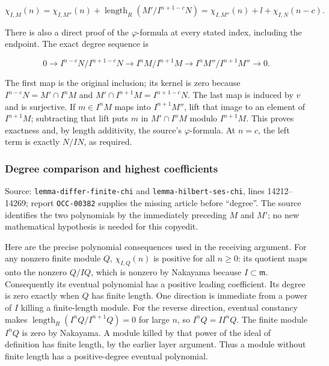 \[
\chi_{I,M}(n)=\chi_{I,M''}(n)
 +\operatorname{length}_R(M'/I^{n+1-c}N)
=\chi_{I,M''}(n)+l+\chi_{I,N}(n-c).
\]

There is also a direct proof of the \(\varphi\)-formula at every stated index, including the endpoint. The exact degree sequence is

\[
0\longrightarrow I^{n-c}N/I^{n+1-c}N
\longrightarrow I^nM/I^{n+1}M
\longrightarrow I^nM''/I^{n+1}M''\longrightarrow0.
\]

The first map is the original inclusion; its kernel is zero because \(I^{n-c}N=M'\cap I^nM\) and \(M'\cap I^{n+1}M=I^{n+1-c}N\). The last map is induced by \(v\) and is surjective. If \(m\in I^nM\) maps into \(I^{n+1}M''\), lift that image to an element of \(I^{n+1}M\); subtracting that lift puts \(m\) in \(M'\cap I^nM\) modulo \(I^{n+1}M\). This proves exactness and, by length additivity, the source's \(\varphi\)-formula. At \(n=c\), the left term is exactly \(N/IN\), as required.

\subsubsection{Degree comparison and highest coefficients}\label{algebra-proof-003-degree-comparison-and-highest-coefficients}

Source: \texttt{lemma-differ-finite-chi} and \texttt{lemma-hilbert-ses-chi}, lines 14212--14269; report \texttt{OCC-00382} supplies the missing article before ``degree''. The source identifies the two polynomials by the immediately preceding \(M\) and \(M'\); no new mathematical hypothesis is needed for this copyedit.

Here are the precise polynomial consequences used in the receiving argument. For any nonzero finite module \(Q\), \(\chi_{I,Q}(n)\) is positive for all \(n\geq0\): its quotient maps onto the nonzero \(Q/IQ\), which is nonzero by Nakayama because \(I\subset\mathfrak m\). Consequently its eventual polynomial has a positive leading coefficient. Its degree is zero exactly when \(Q\) has finite length. One direction is immediate from a power of \(I\) killing a finite-length module. For the reverse direction, eventual constancy makes \(\operatorname{length}_R(I^nQ/I^{n+1}Q)=0\) for large \(n\), so \(I^nQ=I I^nQ\). The finite module \(I^nQ\) is zero by Nakayama. A module killed by that power of the ideal of definition has finite length, by the earlier layer argument. Thus a module without finite length has a positive-degree eventual polynomial.

